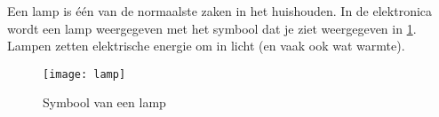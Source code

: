 Een lamp is \'e\'en van de normaalste zaken in het huishouden. In de elektronica wordt een lamp weergegeven met het symbool dat je ziet weergegeven in \ref{symbool:lamp}. Lampen zetten elektrische energie om in licht (en vaak ook wat warmte).

\begin{figure}[h]
\texttt{[image: lamp]}
\centering
\caption{Symbool van een lamp}
\label{symbool:lamp}
\end{figure}

